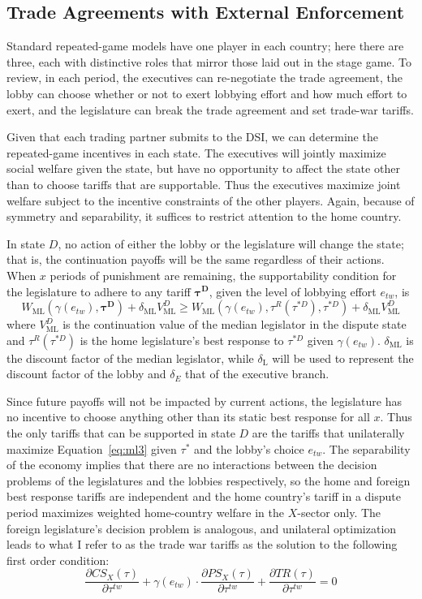 \documentclass[authoryear, review]{elsarticle}
\newcommand{\ga}{\gamma}
\newcommand{\de}{\delta}
\begin{document}
\subsection{Trade Agreements with External Enforcement}
\label{sec:external}
Standard repeated-game models have one player in each country; here there are three, each with distinctive roles that mirror those laid out in the stage game. To review, in each period, the executives can re-negotiate the trade agreement, the lobby can choose whether or not to exert lobbying effort and how much effort to exert, and the legislature can break the trade agreement and set trade-war tariffs.

Given that each trading partner submits to the DSI, we can determine the repeated-game incentives in each state. The executives will jointly maximize social welfare given the state, but have no opportunity to affect the state other than to choose tariffs that are supportable. Thus the executives maximize joint welfare subject to the incentive constraints of the other players. Again, because of symmetry and separability, it suffices to restrict attention to the home country.

In state $D$, no action of either the lobby or the legislature will change the state; that is, the continuation payoffs will be the same regardless of their actions. When $x$ periods of punishment are remaining, the supportability condition for the legislature to adhere to any tariff $\bm{\tau^D}$, given the level of lobbying effort $e_{tw}$, is
\[
  W_\text{ML}(\ga(e_{tw}),\bm{\tau^D}) + \de_\text{ML} V^D_\text{ML} \geq W_\text{ML}(\ga(e_{tw}),\tau^R(\tau^{*D}),\tau^{*D}) + \de_\text{ML} V^D_\text{ML} 
\]
where $V^D_\text{ML}$ is the continuation value of the median legislator in the dispute state and $\tau^R(\tau^{*D})$ is the home legislature's best response to $\tau^{*D}$ given $\ga(e_{tw})$. $\de_\text{ML}$ is the discount factor of the median legislator, while $\de_\text{L}$ will be used to represent the discount factor of the lobby and $\de_E$ that of the executive branch.

Since future payoffs will not be impacted by current actions, the legislature has no incentive to choose anything other than its static best response for all $x$. Thus the only tariffs that can be supported in state $D$ are the tariffs that unilaterally maximize Equation~\ref{eq:ml3} given $\tau^*$ and the lobby's choice $e_{tw}$. The separability of the economy implies that there are no interactions between the decision problems of the legislatures and the lobbies respectively, so the home and foreign best response tariffs are independent and the home country's tariff in a dispute period maximizes weighted home-country welfare in the $X$-sector only. The foreign legislature's decision problem is analogous, and unilateral optimization leads to what I refer to as the trade war tariffs as the solution to the following first order condition:
\[
		\frac{\partial \mathit{CS}_X(\tau)}{\partial \tau^{tw}} + \ga(e_{tw}) \cdot \frac{\partial \mathit{PS}_X(\tau)}{\partial \tau^{tw}} +  \frac{\partial \mathit{TR}(\tau)}{\partial \tau^{tw}} = 0
\]
\end{document}
